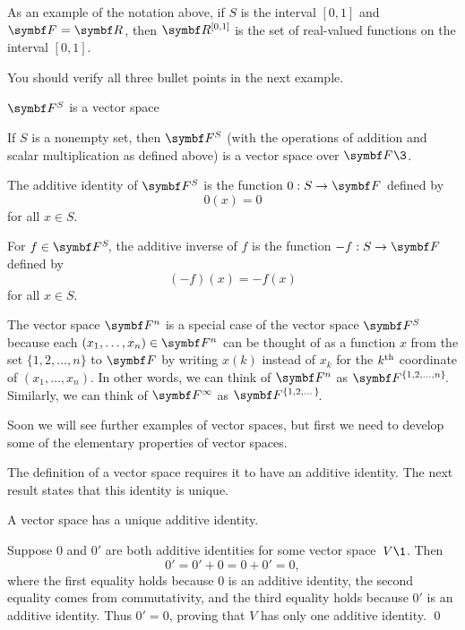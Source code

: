 \pagebreak[3]

As an example of the notation above, if $S$ is the interval $[0, 1]$ and $\F{} = \R{}$, then $\R{[0, 1]}$ is the set of real-valued functions on the interval $[0, 1]$.

You should verify all three bullet points in the next example.

\begin{example}{$\F{S}$ is a vector space}
\begin{Itemize}
\item
If $S$ is a nonempty set, then $\F{S}$ (with the operations of addition and scalar multiplication as defined above) is a vector space over $\F{}\3$.
\item
The additive identity of $\F{S}$ is the function $0: S \to \F{}$ defined by
\[
0(x) = 0
\]
for all $x \in S$.
\item
For $f \in \FF{S}$, the additive inverse of $f$ is the function $-f: S \to \F{}$ defined by
\[
(-f)(x) = -f(x)
\]
for all $x \in S$.
\end{Itemize}
\vspace{-.15in}
\end{example}


The vector space $\F{n}$ is a special case of the vector space $\F{S}$ because each $(x_1, \ldots, x_n) \in \F{n}$ can be thought of as a function $x$ from the set $\{1, 2, \dots, n\}$ to $\F{}$ by writing $x(k)$ instead of $x_k$ for the $k^{\text{{th}}}$ coordinate of $(x_1, \dots, x_n)$. In other words, we can think of $\F{n}$ as $\FF{\{1, 2, \dots, n\}}$. Similarly, we can think of $\F{\infty}$ as $\FF{\{1, 2, \dots \}}$.

Soon we will see further examples of vector spaces, but first we need to
develop some of the elementary properties of vector spaces.

The definition of a vector space requires it to have an additive identity. The next result states that this identity is unique.

{A vector space has a unique additive identity.}

\proof
Suppose $0$ and $0'$ are both additive identities for some vector space~$V\1$.
Then
\[
0' = 0' + 0 = 0 + 0' = 0,
\]
where the first equality holds because $0$ is an additive identity, the second equality comes from commutativity, and the
third equality holds because $0'$ is an additive identity.  Thus $0' = 0$,
proving that $V$ has only one additive identity.
\qed


